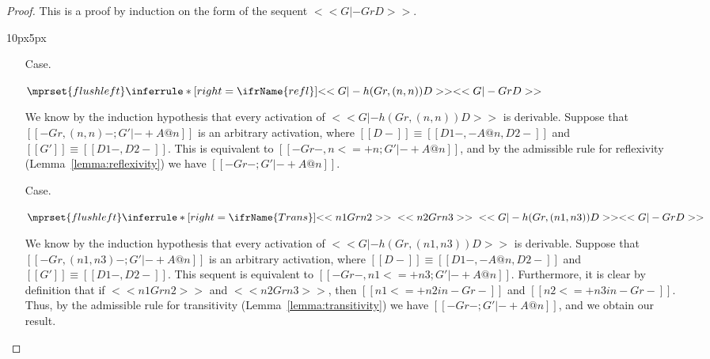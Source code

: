  \begin{proof}
  This is a proof by induction on the form of the sequent $<<G |- Gr D>>$.
  \vspace{-25px}
  \begin{changemargin}{10px}{5px}\noindent
  \begin{itemize}
  \item[Case.]\ \\ 
    \begin{center}
      \begin{math}
        $$\mprset{flushleft}
        \inferrule* [right=\ifrName{refl}] {
          <<G |- h(Gr,(n,n)) D>>
        }{<<G |- Gr D>>}
      \end{math}
    \end{center}
    We know by the induction hypothesis that every activation of $<<G |- h(Gr,(n,n)) D>>$ is derivable.  
    Suppose that $[[-Gr,(n,n)- ; G' |- + A @ n]]$ is an arbitrary activation, where
    $[[{D}-]] \equiv [[{D1}-,-A@n,{D2}-]]$ and $[[G']] \equiv [[{D1}-,{D2}-]]$.
    This is equivalent to $[[-Gr-, n <=+ n ; G' |- + A @ n]]$, and 
    by the admissible rule for reflexivity (Lemma~\ref{lemma:reflexivity}) we have 
    $[[-Gr- ; G' |- + A @ n]]$.

  \item[Case.]\ \\ 
    \begin{center}
      \begin{math}
        $$\mprset{flushleft}
        \inferrule* [right=\ifrName{Trans}] {
          <<n1 Gr n2>>
          \\\\
              <<n2 Gr n3>>
              \\\\
              <<G |- h(Gr,(n1,n3)) D>>
        }{<<G |- Gr D>>}
      \end{math}
    \end{center}
    We know by the induction hypothesis that every activation of $<<G |- h(Gr,(n1,n3)) D>>$ is derivable.  
    Suppose that $[[-Gr,(n1,n3)- ; G' |- + A @ n]]$ is an arbitrary activation, where
    $[[{D}-]] \equiv [[{D1}-,-A@n,{D2}-]]$ and $[[G']] \equiv [[{D1}-,{D2}-]]$.  This sequent
    is equivalent to $[[-Gr-,n1 <=+ n3 ; G' |- + A @ n]]$.  Furthermore, it is clear by definition that
    if $<<n1 Gr n2>>$ and $<<n2 Gr n3>>$, then $[[n1 <=+ n2 in -Gr-]]$ and $[[n2 <=+ n3 in -Gr-]]$.  Thus,
    by the admissible rule for transitivity (Lemma~\ref{lemma:transitivity}) we have $[[-Gr- ; G' |- + A @ n]]$,
    and we obtain our result.
    


\end{itemize}
\end{changemargin}
\end{proof}
